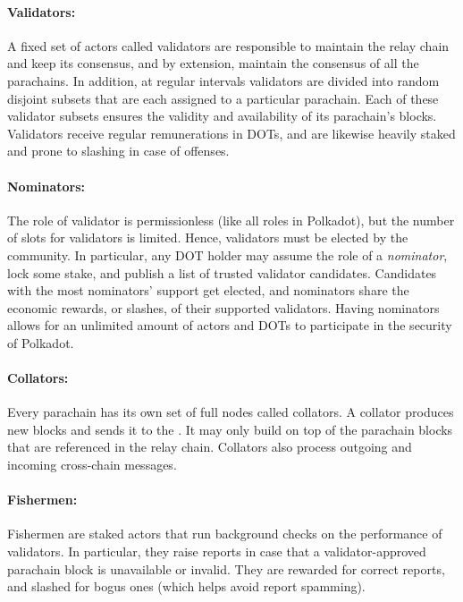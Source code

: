 \paragraph{Validators:} A fixed set of actors called validators are responsible to maintain the relay chain
and keep its consensus, and by extension, maintain the consensus of all the parachains.
In addition, at regular intervals validators are divided into random disjoint subsets
that are each assigned to a particular parachain.
Each of these validator subsets ensures the validity and availability of its parachain's blocks.
Validators receive regular remunerations in DOTs,
and are likewise heavily staked and prone to slashing in case of offenses.

\paragraph{Nominators:} The role of validator is permissionless (like all roles in Polkadot),
but the number of slots for validators is limited. Hence, validators must be elected by the community.
In particular, any DOT holder may assume the role of a \emph{nominator}, lock some stake, and publish a list
of trusted validator candidates. Candidates with the most nominators' support get elected,
and nominators share the economic rewards, or slashes, of their supported validators.
Having nominators allows for an unlimited amount of actors and DOTs to participate in the security of Polkadot.

\paragraph{Collators: } Every parachain has its own set of full nodes called collators.
A collator produces new blocks and sends it to the .
It may only build on top of the parachain blocks that are referenced in the relay chain.
Collators also process outgoing and incoming cross-chain messages.

\paragraph{Fishermen:} Fishermen are staked actors that run background checks on the performance of validators.
In particular, they raise reports in case that a validator-approved parachain block is unavailable or invalid.
They are rewarded for correct reports, and slashed for bogus ones (which helps avoid report spamming).





